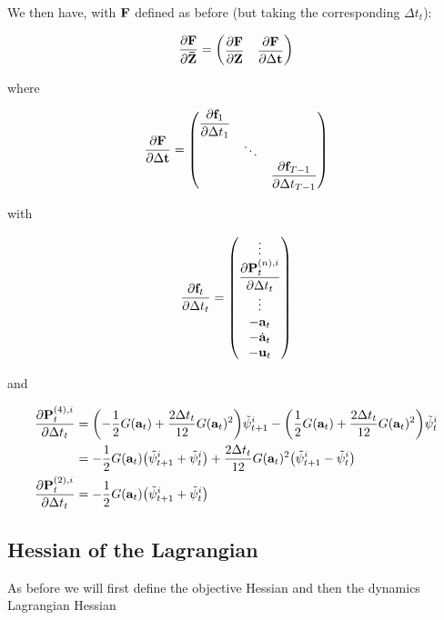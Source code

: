 \documentclass{article}
\newcommand{\isopsi}{\tilde \psi}
\begin{document}
We then have, with $\vb{F}$ defined as before (but taking the corresponding $\Delta t_t$):

\begin{equation}
  \pdv{\vb{F}}{\vb{\bar Z}} = \mqty(
    \displaystyle \pdv{\vb{F}}{\vb{Z}} &  
    \displaystyle \pdv{\vb{F}}{\Delta \vb{t}}
  )
\end{equation}

where 

\begin{equation}
  \pdv{\vb{F}}{\Delta \vb{t}} = \mqty(
    \displaystyle \pdv{\vb{f}_1}{\Delta t_1} \\
    & \ddots \\
    & & \displaystyle \pdv{\vb{f}_{T-1}}{\Delta t_{T-1}}
  )
\end{equation}

with

\begin{equation}
  \pdv{\vb{f}_t}{\Delta t_t} = 
  \mqty(
    \vdots \\
    \displaystyle \pdv{\vb{P}^{(n),i}_t}{\Delta t_t} \\
    \vdots \\
    -\vb{a}_t \\
    - \dot{\vb{a}}_t \\
    - \vb{u}_t \\
  )
\end{equation}

and

\begin{align}
  \pdv{\vb{P}^{(4),i}_t}{\Delta t_t} 
  &= \qty( -\frac{1}{2} G(\vb{a}_t) + \frac{2 \Delta t_t}{12} G(\vb{a}_t)^2) \isopsi^i_{t+1}
  - \qty(\frac{1}{2} G(\vb{a}_t) + \frac{2\Delta t_t}{12} G(\vb{a}_t)^2) \isopsi^i_t \nonumber\\
  &= -\frac{1}{2} G(\vb{a}_t) \qty(\isopsi^i_{t+1} + \isopsi^i_t) + \frac{2\Delta t_t}{12} G(\vb{a}_t)^2 \qty(\isopsi^i_{t+1} - \isopsi^i_t) \\
  \pdv{\vb{P}^{(2),i}_t}{\Delta t_t} 
  &=  -\frac{1}{2} G(\vb{a}_t) \qty(\isopsi^i_{t+1} + \isopsi^i_t)
\end{align}

\newpage

\subsection{Hessian of the Lagrangian}

As before we will first define the objective Hessian and then the dynamics Lagrangian Hessian
\end{document}

